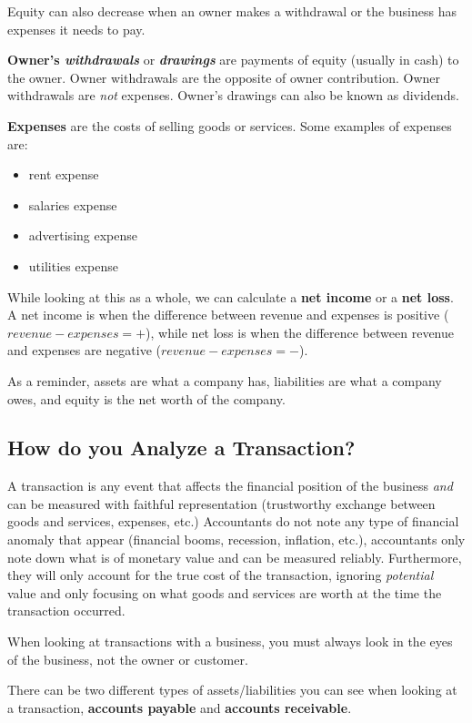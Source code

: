 \documentclass[a4paper, 12pt]{article}
\begin{document}
Equity can also decrease when an owner makes a withdrawal or the business has
expenses it needs to pay.

\textbf{Owner's \emph{withdrawals}} or \textbf{\emph{drawings}} are payments of
equity (usually in cash) to the owner. Owner withdrawals are the opposite of
owner contribution. Owner withdrawals are \emph{not} expenses. Owner's drawings
can also be known as dividends.

\textbf{Expenses} are the costs of selling goods or services. Some examples of
expenses are:
\begin{itemize}
    \item rent expense
    \item salaries expense
    \item advertising expense
    \item utilities expense
\end{itemize}

While looking at this as a whole, we can calculate a \textbf{net income} or a 
\textbf{net loss}. A net income is when the difference between revenue and 
expenses is positive ($revenue - expenses = +$), while net loss is when the
difference between revenue and expenses are negative ($revenue - expenses = -$).

As a reminder, assets are what a company has, liabilities are what a 
company owes, and equity is the net worth of the company.

\subsection{How do you Analyze a Transaction?}
A transaction is any event that affects the financial position of the business
\emph{and} can be measured with faithful representation (trustworthy exchange
between goods and services, expenses, etc.) Accountants do not note any type of
financial anomaly that appear (financial booms, recession, inflation, etc.),
accountants only note down what is of monetary value and can be measured reliably.
Furthermore, they will only account for the true cost of the transaction, ignoring
\emph{potential} value and only focusing on what goods and services are worth at
the time the transaction occurred.

When looking at transactions with a business, you must always look in the eyes
of the business, not the owner or customer.

There can be two different types of assets/liabilities you can see when looking
at a transaction, \textbf{accounts payable} and \textbf{accounts receivable}.
\end{document}
